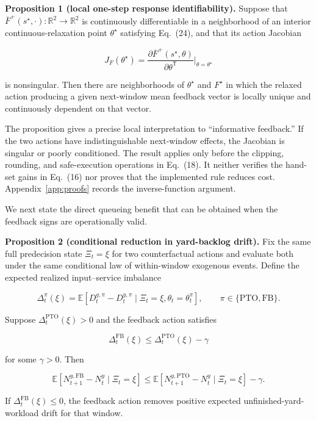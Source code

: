 \documentclass[preprint,12pt,authoryear,a4paper]{elsarticle}
\begin{document}
\noindent\textbf{Proposition 1 (local one-step response identifiability).} Suppose that \(\overline F^{+}(s^\star,\cdot):\mathbb R^2\rightarrow\mathbb R^2\) is continuously differentiable in a neighborhood of an interior continuous-relaxation point \(\theta^\star\) satisfying Eq.~(24), and that its action Jacobian

\[
J_F(\theta^\star)
=\frac{\partial\overline F^{+}(s^\star,\theta)}{\partial\theta^{\mathsf T}}
\bigg|_{\theta=\theta^\star}
\]

is nonsingular. Then there are neighborhoods of \(\theta^\star\) and \(F^\star\) in which the relaxed action producing a given next-window mean feedback vector is locally unique and continuously dependent on that vector.

The proposition gives a precise local interpretation to ``informative feedback.'' If the two actions have indistinguishable next-window effects, the Jacobian is singular or poorly conditioned. The result applies only before the clipping, rounding, and safe-execution operations in Eq.~(18). It neither verifies the hand-set gains in Eq.~(16) nor proves that the implemented rule reduces cost. Appendix~\ref{app:proofs} records the inverse-function argument.

We next state the direct queueing benefit that can be obtained when the feedback signs are operationally valid.

\noindent\textbf{Proposition 2 (conditional reduction in yard-backlog drift).} Fix the same full predecision state \(\Xi_t=\xi\) for two counterfactual actions and evaluate both under the same conditional law of within-window exogenous events. Define the expected realized input--service imbalance

\[
\Delta_t^{\pi}(\xi)
=\mathbb E\!\left[
D_t^{g,\pi}-D_t^{y,\pi}
\mid \Xi_t=\xi,\theta_t=\theta_t^{\pi}
\right],
\qquad \pi\in\{\mathrm{PTO},\mathrm{FB}\}.
\]

Suppose \(\Delta_t^{\mathrm{PTO}}(\xi)>0\) and the feedback action satisfies

\[
\Delta_t^{\mathrm{FB}}(\xi)
\le\Delta_t^{\mathrm{PTO}}(\xi)-\gamma
\]

for some \(\gamma>0\). Then

\[
\mathbb E[N_{t+1}^{y,\mathrm{FB}}-N_t^y\mid \Xi_t=\xi]
\le
\mathbb E[N_{t+1}^{y,\mathrm{PTO}}-N_t^y\mid \Xi_t=\xi]-\gamma.
\tag{25}
\]

If \(\Delta_t^{\mathrm{FB}}(\xi)\le0\), the feedback action removes positive expected unfinished-yard-workload drift for that window.
\end{document}
